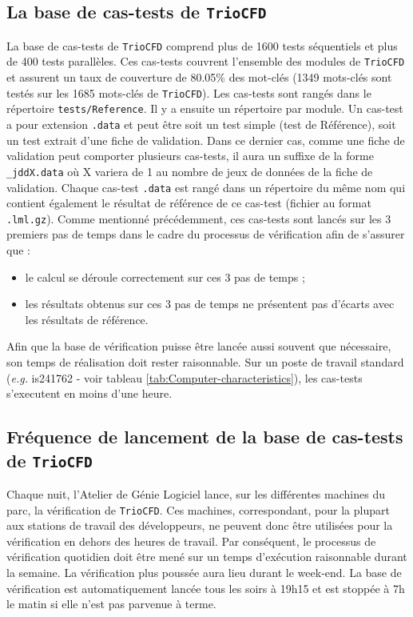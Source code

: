 \subsection{La base de cas-tests de \texttt{TrioCFD}}

La base de cas-tests de \texttt{TrioCFD} comprend plus de 1600 tests s\'equentiels et plus de 400 tests parall\`eles.
Ces cas-tests couvrent l'ensemble des modules de \texttt{TrioCFD} et assurent un taux de couverture de 80.05\% des mot-cl\'es (1349 mots-cl\'es sont test\'es sur les 1685 mots-cl\'es de \texttt{TrioCFD}).
Les cas-tests sont rang\'es dans le r\'epertoire \texttt{tests/Reference}. Il y a ensuite un r\'epertoire par module.
Un cas-test a pour extension \texttt{.data} et peut \^etre soit un test simple (test de R\'ef\'erence), soit un test extrait d'une fiche de validation.
Dans ce dernier cas, comme une fiche de validation peut comporter plusieurs cas-tests,
il aura un suffixe de la forme \texttt{\_jddX.data} o\`u X variera de 1 au nombre de jeux de donn\'ees de la fiche de validation.\newline
Chaque cas-test \texttt{.data} est rang\'e dans un r\'epertoire du m\^eme nom qui contient \'egalement le r\'esultat de r\'ef\'erence de ce cas-test (fichier au format \texttt{.lml.gz}).
Comme mentionn\'e pr\'ec\'edemment, ces cas-tests sont lanc\'es sur les 3 premiers pas de temps dans le cadre du processus de v\'erification afin de s'assurer que :
\begin{itemize}[label=$\Rightarrow$, font=\LARGE]
  \item le calcul se d\'eroule correctement sur ces 3 pas de temps ;
  \item les r\'esultats obtenus sur ces 3 pas de temps ne pr\'esentent pas d'\'ecarts avec les r\'esultats de   r\'ef\'erence.
\end{itemize}
Afin que la base de v\'erification puisse \^etre lanc\'ee aussi souvent que n\'ecessaire, son temps de r\'ealisation doit rester raisonnable.
Sur un poste de travail standard (\textit{e.g.} is241762 - voir tableau \ref{tab:Computer-characteristics}), les cas-tests s'executent en moins d'une heure.


\subsection{Fréquence de lancement de la base de cas-tests de \texttt{TrioCFD}}

Chaque nuit, l'Atelier de G\'enie Logiciel lance, sur les diff\'erentes machines du parc, la v\'erification de \texttt{TrioCFD}. Ces machines, correspondant, pour la plupart aux stations de travail des d\'eveloppeurs, ne peuvent donc \^etre utilis\'ees pour la v\'erification en dehors des heures de travail. Par cons\'equent, le processus de v\'erification quotidien doit \^etre men\'e sur un temps d'ex\'ecution raisonnable durant la semaine. La v\'erification plus pouss\'ee aura lieu durant le week-end. La base de vérification est automatiquement lanc\'ee tous les soirs \`a 19h15 et est stopp\'ee \`a 7h le matin si elle n'est pas parvenue \`a terme.\smallskip\newline


